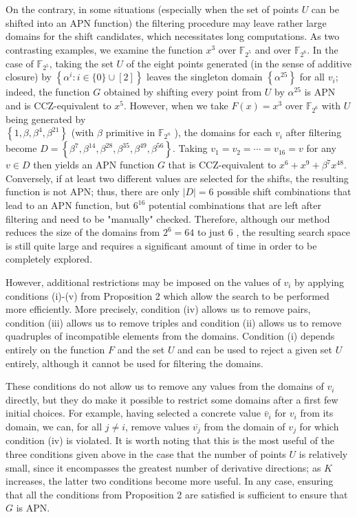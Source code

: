 \documentclass[10pt]{article}
\begin{document}
On the contrary, in some situations (especially when the set of points $U$ can be shifted into an APN function) the filtering procedure may leave rather large domains for the shift candidates, which necessitates long computations. As two contrasting examples, we examine the function $x^{3}$ over $\mathbb{F}_{2^{5}}$ and over $\mathbb{F}_{2^{6}}$. In the case of $\mathbb{F}_{2^{5}}$, taking the set $U$ of the eight points generated (in the sense of additive closure) by $\left\{\alpha^{i}: i \in\{0\} \cup[2]\right\}$ leaves the singleton domain $\left\{\alpha^{25}\right\}$ for all $v_{i}$; indeed, the function $G$ obtained by shifting every point from $U$ by $\alpha^{25}$ is APN and is CCZ-equivalent to $x^{5}$. However, when we take $F(x)=x^{3}$ over $\mathbb{F}_{2^{6}}$ with $U$ being generated by\\
$\left\{1, \beta, \beta^{4}, \beta^{21}\right\}$ (with $\beta$ primitive in $\mathbb{F}_{2^{n}}$ ), the domains for each $v_{i}$ after filtering become $D=\left\{\beta^{7}, \beta^{14}, \beta^{28}, \beta^{35}, \beta^{49}, \beta^{56}\right\}$. Taking $v_{1}=v_{2}=\cdots=v_{16}=v$ for any $v \in D$ then yields an APN function $G$ that is CCZ-equivalent to $x^{6}+x^{9}+\beta^{7} x^{48}$. Conversely, if at least two different values are selected for the shifts, the resulting function is not APN; thus, there are only $|D|=6$ possible shift combinations that lead to an APN function, but $6^{16}$ potential combinations that are left after filtering and need to be "manually" checked. Therefore, although our method reduces the size of the domains from $2^{6}=64$ to just 6 , the resulting search space is still quite large and requires a significant amount of time in order to be completely explored.

However, additional restrictions may be imposed on the values of $v_{i}$ by applying conditions (i)-(v) from Proposition 2 which allow the search to be performed more efficiently. More precisely, condition (iv) allows us to remove pairs, condition (iii) allows us to remove triples and condition (ii) allows us to remove quadruples of incompatible elements from the domains. Condition (i) depends entirely on the function $F$ and the set $U$ and can be used to reject a given set $U$ entirely, although it cannot be used for filtering the domains.

These conditions do not allow us to remove any values from the domains of $v_{i}$ directly, but they do make it possible to restrict some domains after a first few initial choices. For example, having selected a concrete value $\bar{v}_{i}$ for $v_{i}$ from its domain, we can, for all $j \neq i$, remove values $\overline{v_{j}}$ from the domain of $v_{j}$ for which condition (iv) is violated. It is worth noting that this is the most useful of the three conditions given above in the case that the number of points $U$ is relatively small, since it encompasses the greatest number of derivative directions; as $K$ increases, the latter two conditions become more useful. In any case, ensuring that all the conditions from Proposition 2 are satisfied is sufficient to ensure that $G$ is APN.
\end{document}
